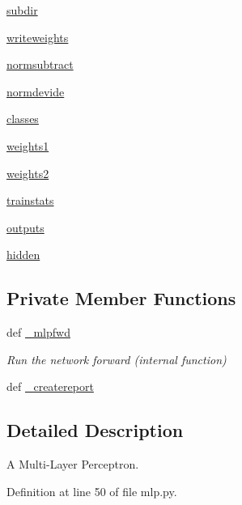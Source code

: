 \begin{DoxyCompactItemize}
\item 
\hyperlink{classmlp_1_1mlp_ad29044bad5109b92f57149d8bec68e14}{subdir}
\item 
\hyperlink{classmlp_1_1mlp_a07b85e2f033556b9ef42dbc9b05011c6}{writeweights}
\item 
\hyperlink{classmlp_1_1mlp_a9f1194a28bf6345709b62f34ef41a8f5}{normsubtract}
\item 
\hyperlink{classmlp_1_1mlp_a667ab65d926bd62ef896add5f059ce06}{normdevide}
\item 
\hyperlink{classmlp_1_1mlp_ae97e72b20c044203c2a86adc234eb9c5}{classes}
\item 
\hyperlink{classmlp_1_1mlp_af03c95450f5cae7754975376c0b80a66}{weights1}
\item 
\hyperlink{classmlp_1_1mlp_aab855561bd19a52513ee8b2c84facaba}{weights2}
\item 
\hyperlink{classmlp_1_1mlp_adf2a63cd452121ea5e135c191dc5723d}{trainstats}
\item 
\hyperlink{classmlp_1_1mlp_ad6d42a5405728d749f144b938b323ce1}{outputs}
\item 
\hyperlink{classmlp_1_1mlp_a4988ae34b275886fce8a1d4c6a167529}{hidden}
\end{DoxyCompactItemize}
\subsection*{Private Member Functions}
\begin{DoxyCompactItemize}
\item 
def \hyperlink{classmlp_1_1mlp_a50fab3d7313376cf2de90bcfc80db3a5}{\_\-mlpfwd}
\begin{DoxyCompactList}\small\item\em Run the network forward (internal function) \item\end{DoxyCompactList}\item 
def \hyperlink{classmlp_1_1mlp_a6adedb6cd519479a5bdec3ca7b3e0c08}{\_\-createreport}
\end{DoxyCompactItemize}


\subsection{Detailed Description}
A Multi-\/Layer Perceptron. 

Definition at line 50 of file mlp.py.



